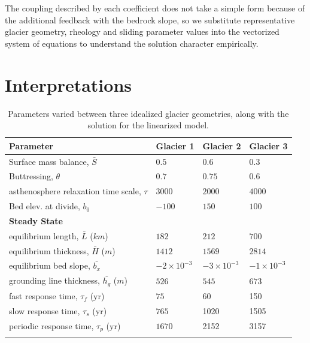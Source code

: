 \documentclass[tc, manuscript]{copernicus}
\begin{document}
The coupling described by each coefficient does not take a simple form because of the additional feedback with the bedrock slope, so we substitute representative glacier geometry, rheology and sliding parameter values into the vectorized system of equations to understand the solution character empirically. 


\section{Interpretations}


\begin{table}[h]
    \begin{tabular}{llll}
        \hline
        \bf{Parameter} & \bf{Glacier 1} & \bf{Glacier 2} & \bf{Glacier 3} \\
        \hline
        Surface mass balance, $\bar{S}$ & $0.5$ & $0.6$ & $0.3$ \\
        Buttressing, $\theta$ & $0.7$ &  $0.75$ & $0.6$ \\
        asthenosphere relaxation time scale, $\tau$ & $3000$ & $2000$ & $4000$ \\
        Bed elev. at divide, $b_0$ & $-100$ & $150$ & $100$  \\
        \hline
        \bf{Steady State} \\
        \hline
        equilibrium length, $\bar{L}$ ($km$) &  $182$  & $212$ & $700$ \\
        equilibrium thickness, $\bar{H}$ ($m$) & $1412$ & $1569$ & $2814$ \\
         equilibrium bed slope, $\bar{b_x}$ & $-2 \times 10^{-3}$ & $-3 \times 10^{-3}$ & $-1 \times 10^{-3}$ \\
        grounding line thickness, $\bar{h_g}$ ($m$) & $526$ & $545$ & $673$ \\
        fast response time, $\tau_f$ (yr) & $75$ & 60 & 150 \\
        slow response time, $\tau_s$ (yr) & $765$ & 1020 & 1505 \\
        periodic response time, $\tau_p$ (yr) & $1670$ & 2152 & 3157 \\
        \hline
        \\
        
    \end{tabular}
    
    \caption{Parameters varied between three idealized glacier geometries, along with the solution for the linearized model.}
\end{table}
\end{document}

